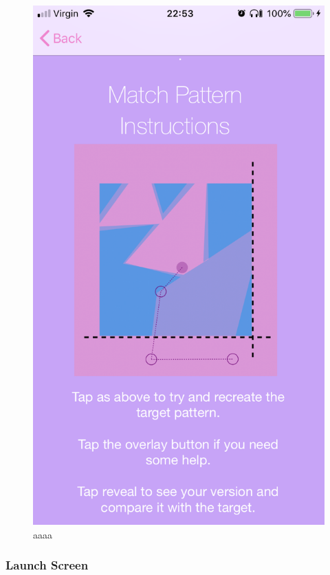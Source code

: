 \documentclass[11pt]{article}
\begin{document}
\begin{figure}[!ht]
\begin{minipage}{0.45\textwidth}
                                    \includegraphics[width=0.7\linewidth]{KiriZen/instructionsMatch.png}
                                    \caption{aaaa}
                                    \label{fig:kiriZen-instructionsMatch}
                                \end{minipage}
                            \end{figure}



                 \subsubsection{Launch Screen}
\end{document}
